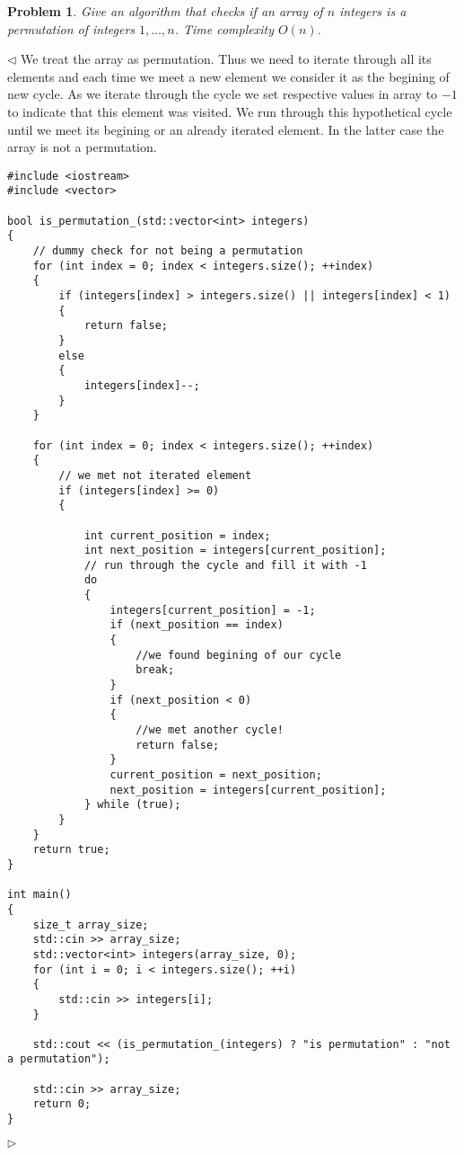\documentclass[12pt]{article}
\newtheorem{problem}{Problem}[subsection]
\newenvironment{solution}{\par $\triangleleft$}{$\triangleright$}
\begin{document}
\begin{problem} Give an algorithm that checks if an array of $n$ integers is a permutation of integers ${1,\ldots,n}$.  Time complexity $O(n)$.
\end{problem}
\begin{solution} We treat the array as permutation. Thus we need to iterate through all its elements and each time we meet a new element we consider it as the begining of new cycle. As we iterate through the cycle we set respective values in array to $-1$ to indicate that this element was visited. We run through this hypothetical cycle until we meet its begining or an already iterated element. In the latter case the array is not a permutation.
 
\begin{verbatim}
#include <iostream>
#include <vector>
 
bool is_permutation_(std::vector<int> integers)
{
    // dummy check for not being a permutation
    for (int index = 0; index < integers.size(); ++index)
    {
        if (integers[index] > integers.size() || integers[index] < 1)
        {
            return false;
        }
        else
        {
            integers[index]--;
        }
    }
 
    for (int index = 0; index < integers.size(); ++index)
    {
        // we met not iterated element
        if (integers[index] >= 0)
        {
 
            int current_position = index;
            int next_position = integers[current_position];
            // run through the cycle and fill it with -1
            do 
            {
                integers[current_position] = -1;
                if (next_position == index)
                {
                    //we found begining of our cycle
                    break;
                }
                if (next_position < 0)
                {
                    //we met another cycle!
                    return false;
                }
                current_position = next_position;
                next_position = integers[current_position];
            } while (true);
        }
    }
    return true;
}
 
int main()
{
    size_t array_size;
    std::cin >> array_size;
    std::vector<int> integers(array_size, 0);
    for (int i = 0; i < integers.size(); ++i)
    {
        std::cin >> integers[i];
    }
 
    std::cout << (is_permutation_(integers) ? "is permutation" : "not a permutation");
 
    std::cin >> array_size;
    return 0;
}
\end{verbatim}
\end{solution}
 
\end{document}
